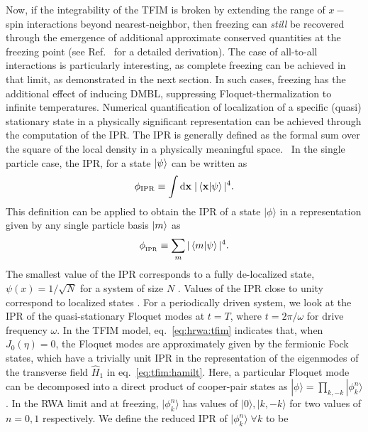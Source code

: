 \documentclass[%
reprint,
superscriptaddress,
amsmath,amssymb,
aps,
prb,
showkeys,
]{revtex4-2}
\begin{document}
Now, if the integrability of the TFIM is broken by extending the range of $x-$spin interactions beyond nearest-neighbor, then freezing can \textit{still} be recovered through the emergence of additional approximate conserved quantities at the freezing point (see Ref.~\cite{rahaman2024time} for a detailed derivation). The case of all-to-all interactions is particularly interesting, as complete freezing can be achieved in that limit, as demonstrated in the next section. In such cases, freezing has the additional effect of inducing DMBL, suppressing Floquet-thermalization to infinite temperatures. Numerical quantification of localization of a specific (quasi) stationary state in a physically significant representation can be achieved through the computation of the IPR.  {The IPR is generally defined as the formal sum over the square of the local density in a physically meaningful space.}~\cite{mukherjee_modulation-assisted_2015,lin_many-body_2018,murphy_generalized_2011, torres-herrera_self-averaging_2020} {In the single particle case,  the IPR, } for a state $\ket{\psi}$ can be written as
\begin{equation*}
	\phi_{\mathrm{IPR}}\equiv \int \mathrm{d}\mathbf{x}\;\vert\ip{\mathbf{x}}{\psi}\vert^4.
\end{equation*}
This definition can be {applied} to {obtain} the IPR of a state $|\phi\rangle$ in a representation given by {any single particle} basis $\ket{m}$ as 
\begin{equation}
	\label{eq:ipr:defn}
	\phi_{{_\mathrm{IPR}}} \equiv \sum_m\vert\ip{m}{\psi}\vert^4.
\end{equation}
The smallest value of the IPR corresponds to a fully de-localized state, $\psi(x)=1/\sqrt{N}$ for a system of size $N$ \cite{torres-herrera_self-averaging_2020,trivedi_can_2005}. Values of the IPR close to unity correspond to localized states \cite{Misguich2016}. For a periodically driven system, we look at the IPR of the quasi-stationary Floquet modes at $t=T$, where $t=2\pi/\omega$ for drive frequency $\omega$. In the TFIM model, eq.~\ref{eq:hrwa:tfim} indicates that, when $J_0(\eta)=0$, the Floquet modes are approximately given by the fermionic Fock states, which have a trivially unit IPR in the representation of the eigenmodes of the transverse field $\hat{H}_1$ in eq.~\ref{eq:tfim:hamilt}. Here, a particular Floquet mode can be decomposed into a direct product of cooper-pair states as $|\phi\rangle = \prod_{k,-k}|\phi^n_k\rangle$. In the RWA limit and at freezing, $|\phi^n_k\rangle$ has values of $|0\rangle, |k,-k\rangle$ for two values of $n=0,1$ respectively. We define the reduced IPR of $|\phi^n_k\rangle\; \forall k$ to be
\end{document}
